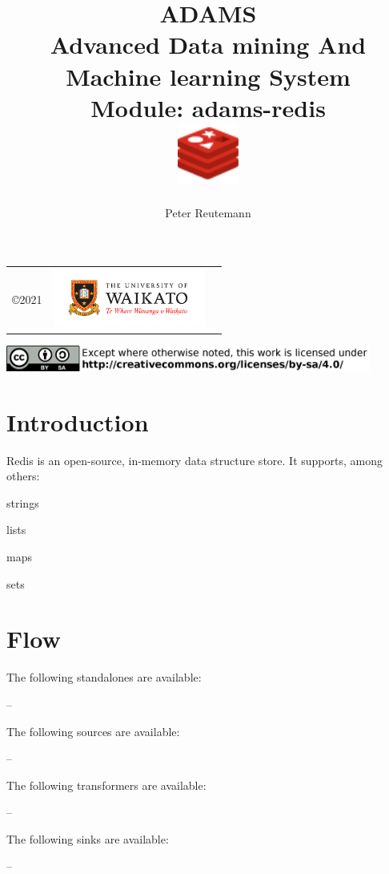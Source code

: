 \documentclass[a4paper]{book}
\title{
  \textbf{ADAMS} \\
  {\Large \textbf{A}dvanced \textbf{D}ata mining \textbf{A}nd \textbf{M}achine
  learning \textbf{S}ystem} \\
  {\Large Module: adams-redis} \\
  \vspace{1cm}
  \includegraphics[width=2cm]{images/redis-module.png} \\
}
\author{
  Peter Reutemann
}
\begin{document}
\begin{titlepage}
\maketitle

\thispagestyle{empty}
\center
\begin{table}[b]
	\begin{tabular}{c l l}
		\parbox[c][2cm]{2cm}{\copyright 2021} &
		\parbox[c][2cm]{5cm}{\includegraphics[width=5cm]{images/coat_of_arms.pdf}} \\
	\end{tabular}
	\includegraphics[width=12cm]{images/cc.png} \\
\end{table}

\end{titlepage}

\tableofcontents

\chapter{Introduction}
Redis\cite{redis} is an open-source, in-memory data structure store. It supports, among others:
\begin{tight_itemize}
  \item strings
  \item lists
  \item maps
  \item sets
\end{tight_itemize}

\chapter{Flow}
The following standalones are available:
\begin{tight_itemize}
  \item \textit{} -- 
\end{tight_itemize}

\noindent The following sources are available:
\begin{tight_itemize}
  \item \textit{} -- 
\end{tight_itemize}

\noindent The following transformers are available:
\begin{tight_itemize}
  \item \textit{} -- 
\end{tight_itemize}

\noindent The following sinks are available:
\begin{tight_itemize}
  \item \textit{} -- 
\end{tight_itemize}


\end{document}
